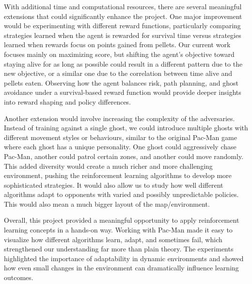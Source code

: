 \documentclass{article}
\begin{document}
With additional time and computational resources, there are several meaningful extensions that could significantly enhance the project. One major improvement would be experimenting with different reward functions, particularly comparing strategies learned when the agent is rewarded for survival time versus strategies learned when rewards focus on points gained from pellets. Our current work focuses mainly on maximizing score, but shifting the agent’s objective toward staying alive for as long as possible could result in a different pattern due to the new objective, or a similar one due to the correlation between time alive and pellets eaten. Observing how the agent balances risk, path planning, and ghost avoidance under a survival-based reward function would provide deeper insights into reward shaping and policy differences.

Another extension would involve increasing the complexity of the adversaries. Instead of training against a single ghost, we could introduce multiple ghosts with different movement styles or behaviours, similar to the original Pac-Man game where each ghost has a unique personality. One ghost could aggressively chase Pac-Man, another could patrol certain zones, and another could move randomly. This added diversity would create a much richer and more challenging environment, pushing the reinforcement learning algorithms to develop more sophisticated strategies. It would also allow us to study how well different algorithms adapt to opponents with varied and possibly unpredictable policies. This would also mean a much bigger layout of the map/environment.

Overall, this project provided a meaningful opportunity to apply reinforcement learning concepts in a hands-on way. Working with Pac-Man made it easy to visualize how different algorithms learn, adapt, and sometimes fail, which strengthened our understanding far more than plain theory. The experiments highlighted the importance of adaptability in dynamic environments and showed how even small changes in the environment can dramatically influence learning outcomes. 




\iffalse
\end{document}
